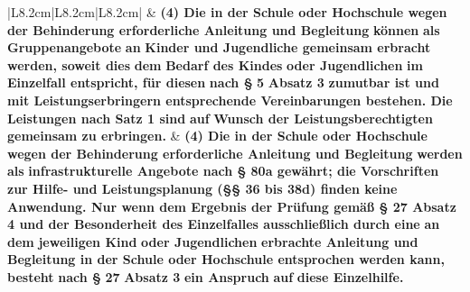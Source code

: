 \documentclass[10pt,a4paper,landscape]{article}
\begin{document}
\begin{longtable}{|L{8.2cm}|L{8.2cm}|L{8.2cm}|}
\hhline{|---|}
 & \textbf{(4) Die in der Schule oder Hochschule  \newline wegen der Behinderung erforderliche  \newline Anleitung und Begleitung }\textbf{\textcolor{diffred}{können}}\textbf{ als} \newline \textbf{\textcolor{diffred}{Gruppenangebote}}\textbf{ an }\textbf{\textcolor{diffred}{Kinder und  \newline Jugendliche gemeinsam erbracht  \newline werden, soweit dies}}\textbf{ dem }\textbf{\textcolor{diffred}{Bedarf des  \newline Kindes}}\textbf{ oder Jugendlichen }\textbf{\textcolor{diffred}{im Einzelfall  \newline entspricht, für diesen}}\textbf{ nach \S{} }\textbf{\textcolor{diffred}{5}}\textbf{ Absatz 3} \newline \textbf{\textcolor{diffred}{zumutbar ist und mit  \newline Leistungserbringern entsprechende  \newline Vereinbarungen bestehen. Die  \newline Leistungen nach Satz 1 sind}}\textbf{ auf} \newline \textbf{\textcolor{diffred}{Wunsch der Leistungsberechtigten  \newline gemeinsam zu erbringen.}} & \textbf{(4) Die in der Schule oder Hochschule  \newline wegen der Behinderung erforderliche  \newline Anleitung und Begleitung }\textbf{\textcolor{diffgreen}{werden}}\textbf{ als} \newline \textbf{\textcolor{diffgreen}{infrastrukturelle Angebote nach \S{} 80a  \newline gewährt; die Vorschriften zur Hilfe- und  \newline Leistungsplanung (\S{}\S{} 36 bis 38d) finden  \newline keine Anwendung. Nur wenn dem  \newline Ergebnis der Prüfung gemäß \S{} 27  \newline Absatz 4 und der Besonderheit des  \newline Einzelfalles ausschließlich durch eine}}\textbf{  \newline an dem }\textbf{\textcolor{diffgreen}{jeweiligen Kind}}\textbf{ oder  \newline Jugendlichen }\textbf{\textcolor{diffgreen}{erbrachte Anleitung und  \newline Begleitung in der Schule oder  \newline Hochschule entsprochen werden kann,  \newline besteht}}\textbf{ nach \S{} }\textbf{\textcolor{diffgreen}{27}}\textbf{ Absatz 3 }\textbf{\textcolor{diffgreen}{ein  \newline Anspruch}}\textbf{ auf }\textbf{\textcolor{diffgreen}{diese Einzelhilfe.}} \\

\end{longtable}
\end{document}
